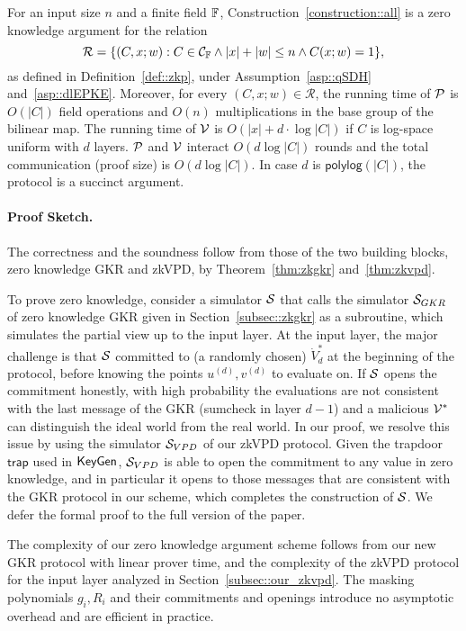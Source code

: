 \begin{theorem}\label{theorem:main}
	For an input size $n$ and a finite field $\F$, Construction~\ref{construction::all} is a zero knowledge argument for the relation
	\[
	\mathcal{R} = \{(C,x;w): C\in\mathcal{C}_\F\wedge|x|+|w|\le n\wedge C(x;w) = 1\},
	\]
	as defined in Definition~\ref{def::zkp}, under Assumption~\ref{asp::qSDH} and~\ref{asp::dlEPKE}. Moreover, for every $(C,x;w)\in\mathcal{R}$, the running time of $\P$ is $O(|C|)$ field operations and $O(n)$ multiplications in the base group of the bilinear map. The running time of $\V$ is $O(|x|+d\cdot\log |C|)$ if $C$ is log-space uniform with $d$ layers. $\P$ and $\V$ interact $O(d\log |C|)$ rounds and the total communication (proof size) is $O(d\log |C|)$. In case $d$ is $\mathsf{polylog}(|C|)$, the protocol is a succinct argument.
\end{theorem}

\paragraph{Proof Sketch.} The correctness and the soundness follow from those of the two building blocks, zero knowledge GKR and zkVPD, by Theorem~\ref{thm:zkgkr} and~\ref{thm:zkvpd}.

To prove zero knowledge, consider a simulator $\S$ that calls the simulator $\S_{GKR}$ of zero knowledge GKR given in Section~\ref{subsec::zkgkr} as a subroutine, which simulates the partial view up to the input layer. At the input layer, the major challenge is that $\S$ committed to (a randomly chosen) $\dot{V}^*_d$ at the beginning of the protocol, before knowing the points $u^{(d)}, v^{(d)}$ to evaluate on. If $\S$ opens the commitment honestly, with high probability the evaluations are not consistent with the last message of the GKR (sumcheck in layer $d-1$) and a malicious $\V^*$ can distinguish the ideal world from the real world. In our proof, we resolve this issue by using the simulator $\S_{VPD}$ of our zkVPD protocol. Given the trapdoor $\mathsf{trap}$ used in $\KeyGen$, $\S_{VPD}$ is able to open the commitment to any value in zero knowledge, and in particular it opens to those messages that are consistent with the GKR protocol in our scheme, which completes the construction of $\S$. We defer the formal proof to the full version of the paper. 

The complexity of our zero knowledge argument scheme follows from our new GKR protocol with linear prover time, and the complexity of the zkVPD protocol for the input layer analyzed in Section~\ref{subsec::our_zkvpd}. The masking polynomials $g_i, R_i$ and their commitments and openings introduce no asymptotic overhead and are efficient in practice.



